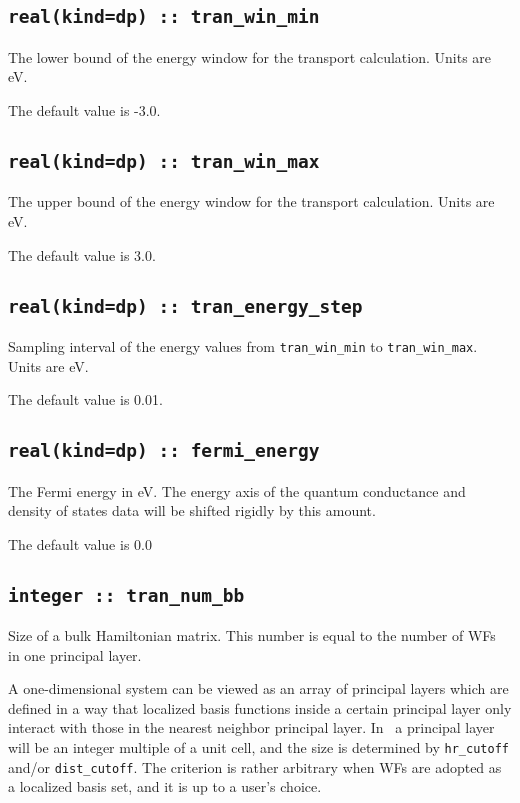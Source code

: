 \subsection[tran\_win\_min]{\tt real(kind=dp) :: tran\_win\_min}
The lower bound of the energy window for the transport calculation. 
Units are eV.

The default value is -3.0.

\subsection[tran\_win\_max]{\tt real(kind=dp) :: tran\_win\_max}
The upper bound of the energy window for the transport calculation. 
Units are eV.

The default value is 3.0.

\subsection[tran\_energy\_step]{\tt real(kind=dp) :: tran\_energy\_step}
Sampling interval of the energy values from \verb#tran_win_min# 
to \verb#tran_win_max#. 
Units are eV.

The default value is 0.01.

\subsection[fermi\_energy]{\tt real(kind=dp) :: fermi\_energy}
The Fermi energy in eV. The energy axis of the quantum conductance and
density of states data will be shifted rigidly by this amount.

The default value is 0.0

\subsection[tran\_num\_bb]{\tt integer :: tran\_num\_bb}
Size of a bulk Hamiltonian matrix.
This number is equal to the number of WFs in one principal
layer. 

A one-dimensional system can be viewed
as an array of principal layers
which are defined in a way that
localized basis functions inside a certain principal layer
only interact with those in the nearest neighbor principal layer.
In \wannier\ a principal layer will be an integer multiple
of a unit cell, and the size is determined by
\verb#hr_cutoff# and/or \verb#dist_cutoff#.
The criterion is rather arbitrary
when WFs are adopted as a localized basis set, 
and it is up to a user's choice.

